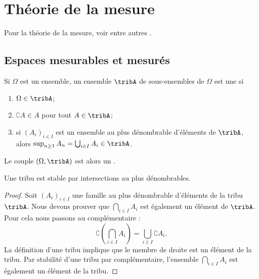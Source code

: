 
\section{Théorie de la mesure}

Pour la théorie de la mesure, voir entre autres \cite{FubiniBMauray,ProbaDanielLi}.

\subsection{Espaces mesurables et mesurés}

\begin{definition}
    Si \( \Omega\) est un ensemble, un ensemble \( \tribA\) de sous-ensembles de \( \Omega\) est une  si
    \begin{enumerate}
        \item
            \( \Omega\in\tribA\);
        \item
            \( \complement A\in A\) pour tout \( A\in\tribA\);
        \item
            si \( (A_i)_{i\in I}\) est un ensemble au plus dénombrable d'éléments de \( \tribA\), alors \( \sup_{n\geq 1}A_n=\bigcup_{i\in I}A_i\in\tribA\).
    \end{enumerate}
    Le couple \( (\Omega,\tribA)\) est alors un .
\end{definition}

\begin{lemma}
    Une tribu est stable par intersections au plus dénombrables.
\end{lemma}

\begin{proof}
    Soit \( (A_i)_{i\in I}\) une famille au plus dénombrable d'éléments de la tribu \( \tribA\). Nous devons prouver que \( \bigcap_{i\in I}A_i\) est également un élément de \( \tribA\). Pour cela nous passons au complémentaire :
    \begin{equation}
        \complement\left( \bigcap_{i\in I}A_i \right)=\bigcup_{i\in I}\complement A_i.
    \end{equation}
    La définition d'une tribu implique que le membre de droite est un élément de la tribu. Par stabilité d'une tribu par complémentaire, l'ensemble \( \bigcap_{i\in I}A_i\) est également un élément de la tribu.
\end{proof}

